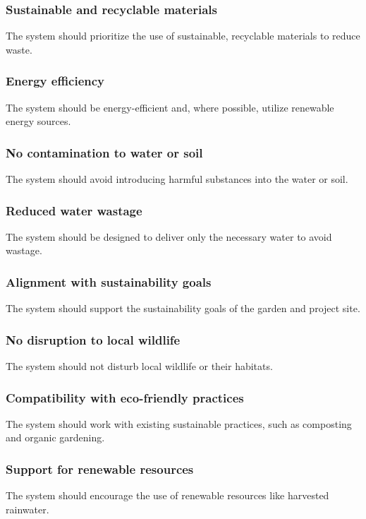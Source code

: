 \documentclass[12pt]{report}
\begin{document}
\subsubsection{Sustainable and recyclable materials}
The system should prioritize the use of sustainable, recyclable materials to reduce waste.

\subsubsection{Energy efficiency}
The system should be energy-efficient and, where possible, utilize renewable energy sources.

\subsubsection{No contamination to water or soil}
The system should avoid introducing harmful substances into the water or soil.

\subsubsection{Reduced water wastage}
The system should be designed to deliver only the necessary water to avoid wastage.

\subsubsection{Alignment with sustainability goals}
The system should support the sustainability goals of the garden and project site.

\subsubsection{No disruption to local wildlife}
The system should not disturb local wildlife or their habitats.

\subsubsection{Compatibility with eco-friendly practices}
The system should work with existing sustainable practices, such as composting and organic gardening.

\subsubsection{Support for renewable resources}
The system should encourage the use of renewable resources like harvested rainwater.
\end{document}
